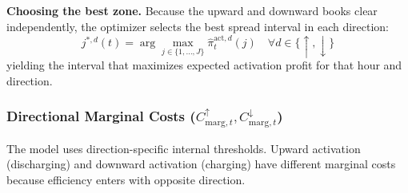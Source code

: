 


\textbf{Choosing the best zone.}
Because the upward and downward books clear independently, the optimizer selects the best spread interval in each direction:
\begin{equation}\label{eq:pi-act-max}
    j^{*,d}(t) = \arg\max_{j\in\{1,\dots,J\}} \hat{\pi}_{t}^{\text{act},d}(j) \quad \forall d \in \{\uparrow, \downarrow\}
\end{equation}
yielding the interval that maximizes expected activation profit for that hour and direction.

\subsubsection{Directional Marginal Costs ($C_{\text{marg}, t}^{\uparrow}, C_{\text{marg}, t}^{\downarrow}$)}

The model uses direction-specific internal thresholds. Upward activation (discharging) and downward activation (charging) have different marginal costs because efficiency enters with opposite direction.


